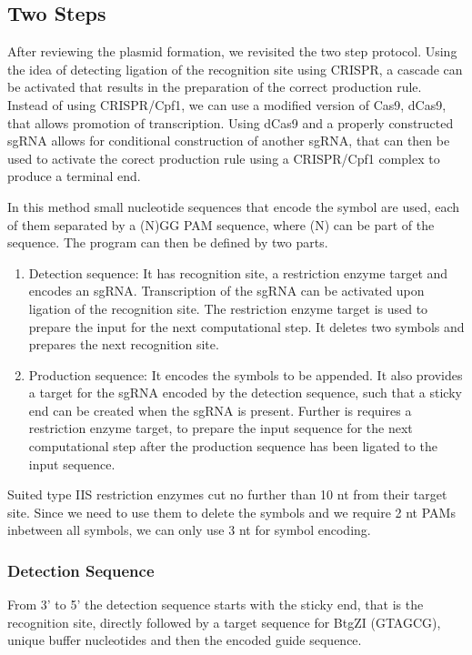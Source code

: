 \documentclass[
11pt, %
a4paper, %
oneside, %
headinclude,footinclude, %
BCOR5mm, %
]{scrartcl}
\begin{document}
\subsection{Two Steps}

After reviewing the plasmid formation, we revisited the two step protocol. Using
the idea of detecting ligation of the recognition site using CRISPR, a cascade
can be activated that results in the preparation of the correct production rule.
Instead of using CRISPR/Cpf1, we can use a modified version of Cas9, dCas9, that
allows promotion of transcription. Using dCas9 and a properly constructed sgRNA
allows for conditional construction of another sgRNA, that can then be used to
activate the corect production rule using a CRISPR/Cpf1 complex to produce a
terminal end.

In this method small nucleotide sequences that encode the symbol are used, each
of them separated by a (N)GG PAM sequence, where (N) can be part of the
sequence. The program can then be defined by two parts.
\begin{enumerate}
  \item Detection sequence: It has recognition site, a restriction enzyme
    target and encodes an sgRNA. Transcription of the sgRNA can be activated
    upon ligation of the recognition site. The restriction enzyme target is used
    to prepare the input for the next computational step. It deletes two symbols
    and prepares the next recognition site.
  \item Production sequence: It encodes the symbols to be appended. It also
    provides a target for the sgRNA encoded by the detection sequence, such that
    a sticky end can be created when the sgRNA is present. Further is requires a
    restriction enzyme target, to prepare the input sequence for the next
    computational step after the production sequence has been ligated to the
    input sequence.
\end{enumerate}
Suited type IIS restriction enzymes cut no further than 10 nt from their target site.
Since we need to use them to delete the symbols and we require 2 nt PAMs
inbetween all symbols, we can only use 3 nt for symbol encoding.

\subsubsection{Detection Sequence}

From 3' to 5' the detection sequence starts with the sticky end, that is the
recognition site, directly followed by a target sequence for BtgZI (GTAGCG),
unique buffer nucleotides and then the encoded guide sequence.
\end{document}
